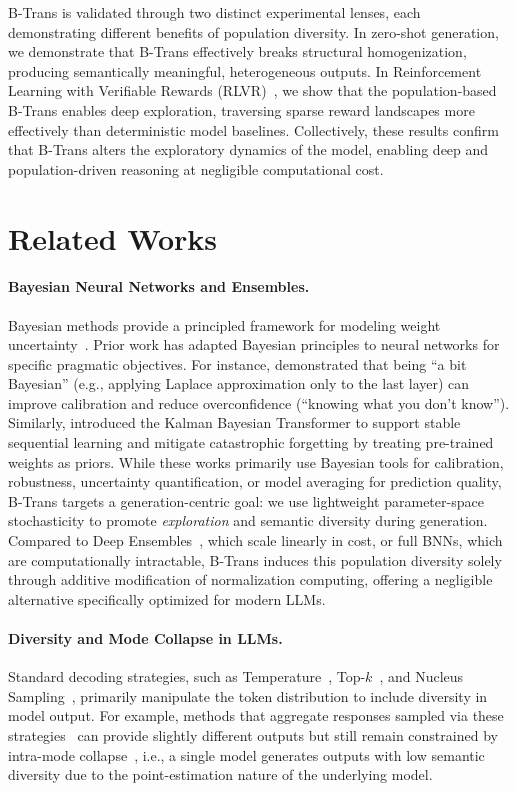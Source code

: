\documentclass[11pt]{article}
\begin{document}
B-Trans is validated through two distinct experimental lenses, each demonstrating different benefits of population diversity. 
In zero-shot generation, we demonstrate that B-Trans effectively breaks structural homogenization, producing semantically meaningful, heterogeneous outputs. 
In Reinforcement Learning with Verifiable Rewards (RLVR)~\cite{guo2025deepseek}, we show that the population-based B-Trans enables deep exploration, traversing sparse reward landscapes more effectively than deterministic model baselines. 
Collectively, these results confirm that B-Trans alters the exploratory dynamics of the model, enabling deep and population-driven reasoning at negligible computational cost. 


\section{Related Works}
\label{sec:related_work}

\paragraph{Bayesian Neural Networks and Ensembles.}
Bayesian methods provide a principled framework for modeling weight uncertainty~\citep{blundell2015weight}. 
Prior work has adapted Bayesian principles to neural networks for specific pragmatic objectives. 
For instance, \citet{kristiadi2020being} demonstrated that being ``a bit Bayesian'' (e.g., applying Laplace approximation only to the last layer) can improve calibration and reduce overconfidence (``knowing what you don't know''). 
Similarly, \citet{jing2025kalman} introduced the Kalman Bayesian Transformer to support stable sequential learning and mitigate catastrophic forgetting by treating pre-trained weights as priors. 
While these works primarily use Bayesian tools for calibration, robustness, uncertainty quantification, or model averaging for prediction quality, B-Trans targets a generation-centric goal: we use lightweight parameter-space stochasticity to promote \emph{exploration} and semantic diversity during generation. 
Compared to Deep Ensembles~\citep{lakshminarayanan2017simple}, which scale linearly in cost, or full BNNs, which are computationally intractable, B-Trans induces this population diversity solely through additive modification of normalization computing, offering a negligible alternative specifically optimized for modern LLMs.

\paragraph{Diversity and Mode Collapse in LLMs.}
Standard decoding strategies, such as Temperature~\cite{ficler2017controlling}, Top-$k$~\cite{fan2018hierarchical}, and Nucleus Sampling~\cite{holtzman2019curious}, primarily manipulate the token distribution to include diversity in model output. For example, methods that aggregate responses sampled via these strategies~\cite{wang2022self} can provide slightly different outputs but still remain constrained by intra-mode collapse~\cite{kirk2023understanding}, i.e., a single model generates outputs with low semantic diversity due to the point-estimation nature of the underlying model. 
\end{document}
